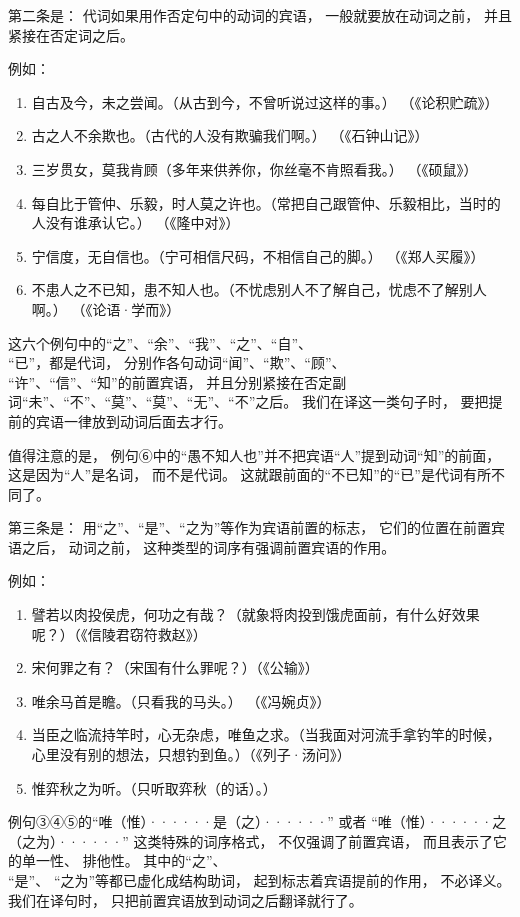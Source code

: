 第二条是：
代词如果用作否定句中的动词的宾语，
一般就要放在动词之前，
并且紧接在否定词之后。

例如：

\noindent
\begin{enumerate}[label=\textcircled{\arabic*}]
	\item 自古及今，未之尝闻。（从古到今，不曾听说过这样的事。） （《论积贮疏》）
	\item 古之人不余欺也。（古代的人没有欺骗我们啊。） （《石钟山记》）
	\item 三岁贯女，莫我肯顾（多年来供养你，你丝毫不肯照看我。） （《硕鼠》）
	\item 每自比于管仲、乐毅，时人莫之许也。（常把自己跟管仲、乐毅相比，当时的人没有谁承认它。） （《隆中对》）
	\item 宁信度，无自信也。（宁可相信尺码，不相信自己的脚。） （《郑人买履》）
	\item 不患人之不已知，患不知人也。（不忧虑别人不了解自己，忧虑不了解别人啊。） （《论语·学而》）
\end{enumerate}

这六个例句中的“之”、“余”、“我”、“之”、“自”、\\ “已”，都是代词，
分别作各句动词“闻”、“欺”、“顾”、\\ “许”、“信”、“知”的前置宾语，
并且分别紧接在否定副词“未”、“不”、“莫”、“莫”、“无”、“不”之后。
我们在译这一类句子时，
要把提前的宾语一律放到动词后面去才行。

值得注意的是，
例句⑥中的“愚不知人也”并不把宾语“人”提到动词“知”的前面，
这是因为“人”是名词，
而不是代词。
这就跟前面的“不已知”的“已”是代词有所不同了。

第三条是：
用“之”、“是”、“之为”等作为宾语前置的标志，
它们的位置在前置宾语之后，
动词之前，
这种类型的词序有强调前置宾语的作用。

例如：

\noindent
\begin{enumerate}[label=\textcircled{\arabic*}]
	\item 譬若以肉投侯虎，何功之有哉？（就象将肉投到饿虎面前，有什么好效果呢？）（《信陵君窃符救赵》）
	\item 宋何罪之有？（宋国有什么罪呢？）（《公输》）
	\item 唯余马首是瞻。（只看我的马头。） （《冯婉贞》）
	\item 当臣之临流持竿时，心无杂虑，唯鱼之求。（当我面对河流手拿钓竿的时候，心里没有别的想法，只想钓到鱼。）（《列子·汤问》）
	\item 惟弈秋之为听。（只听取弈秋（的话）。）
\end{enumerate}
例句③④⑤的“唯（惟）······是（之）······”
或者
“唯（惟）······之（之为）······”
这类特殊的词序格式，
不仅强调了前置宾语，
而且表示了它的单一性、
排他性。
其中的“之”、\\ “是”、
“之为”等都已虚化成结构助词，
起到标志着宾语提前的作用，
不必译义。
我们在译句时，
只把前置宾语放到动词之后翻译就行了。

